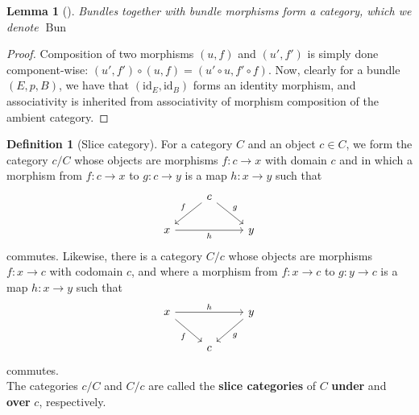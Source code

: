\documentclass[reqno]{amsart}
\newtheorem{lemma}[theorem]{Lemma}
\theoremstyle{definition}
\newtheorem{definition}[theorem]{Definition}
\theoremstyle{remark}
\DeclareMathOperator{\Bun}{Bun}
\newcommand{\id}{{\mathrm{id}}}
\begin{document}
    \begin{lemma}[]
        Bundles together with bundle morphisms form a category,
        which we denote $\Bun$
    \end{lemma}

    \begin{proof}
    Composition of two morphisms
    $\left( u,f \right) $ and
    $\left( u',f' \right) $ is simply done component-wise:
    $\left( u',f' \right) \circ
    \left( u,f \right) =
    \left( u' \circ u, f' \circ f \right) $.
    Now, clearly for a bundle $\left( E,p,B \right) $, we have that
    $\left( \id_E, \id_B \right) $ forms an identity morphism, and
    associativity is inherited from associativity of
    morphism composition of the ambient category.






    \end{proof}


    \begin{definition}[Slice category]
        For a category $C$ and an object
        $c \in C$, we form the category
        $c / C$ whose objects are morphisms
        $f \colon c \to x$ with domain
        $c$ and in which a morphism from
        $f \colon c \to x$ to $g \colon c\to y$ is a
        map $h \colon x\to y$ such that
        \begin{equation*}
        \begin{tikzcd}
            & c \ar[dl, "f"'] \ar[dr, "g"] &\\
            x \ar[rr, "h"'] & & y
        \end{tikzcd}
        \end{equation*}
        commutes.
        Likewise, there is a category
        $C / c$ whose objects are morphisms
        $f \colon x \to c$ with codomain $c$, and
        where a morphism from $f \colon x\to c$ to
        $g \colon y \to c$ is a map
        $h \colon x\to y$ such that
        \begin{equation*}
        \begin{tikzcd}
            x \ar[rr, "h"] \ar[dr, "f"'] && y \ar[dl, "g"]\\
                                        & c&
        \end{tikzcd}
        \end{equation*}
        commutes.\\
        The categories 
        $c / C$ and $C / c$ are called the 
        \textbf{slice categories} of $C$ 
        \textbf{under} and \textbf{over} $c$, respectively.
    \end{definition}
    
\end{document}
